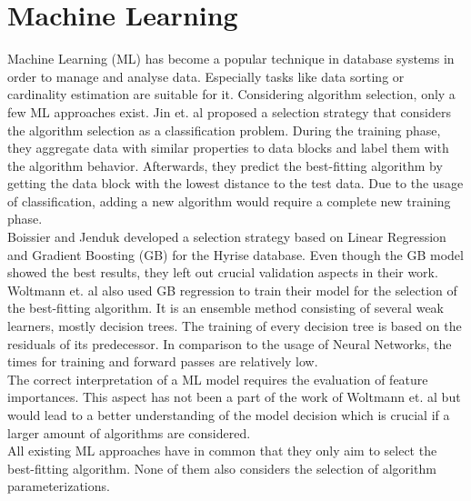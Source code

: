 \section{Machine Learning}
Machine Learning (ML) has become a popular technique in database systems in order to manage and analyse data. Especially tasks like data sorting \cite{Kristo2020} or cardinality estimation \cite{Kipf} are suitable for it. Considering algorithm selection, only a few ML approaches exist. Jin et. al \cite{Jin2019} proposed a selection strategy that considers the algorithm selection as a classification problem. During the training phase, they aggregate data with similar properties to data blocks and label them with the algorithm behavior. Afterwards, they predict the best-fitting algorithm by getting the data block with the lowest distance to the test data. Due to the usage of classification, adding a new algorithm would require a complete new training phase.\\
Boissier and Jenduk \cite{Boissier} developed a selection strategy based on Linear Regression and Gradient Boosting (GB) for the Hyrise database. Even though the GB model showed the best results, they left out crucial validation aspects in their work.\\
Woltmann et. al \cite{Woltmann2021} also used GB regression to train their model for the selection of the best-fitting algorithm. It is an ensemble method consisting of several weak learners, mostly decision trees. The training of every decision tree is based on the residuals of its predecessor. In comparison to the usage of Neural Networks, the times for training and forward passes are relatively low.\\
The correct interpretation of a ML model requires the evaluation of feature importances. This aspect has not been a part of the work of Woltmann et. al \cite{Woltmann2021} but would lead to a better understanding of the model decision which is crucial if a larger amount of algorithms are considered.\\
All existing ML approaches have in common that they only aim to select the best-fitting algorithm. None of them also considers the selection of algorithm parameterizations.